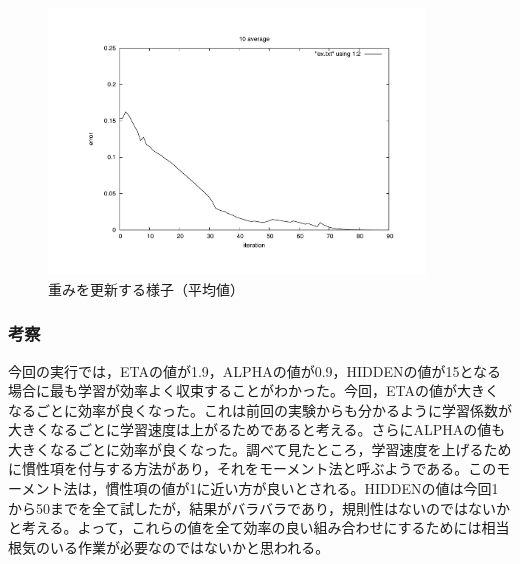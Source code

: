 \begin{figure}[h]
 \begin{center}
  \includegraphics[width=10.0cm,angle=-90]{figs/ave1.pdf}
  \caption{重みを更新する様子（平均値）}
  \label{fig:level2}
 \end{center}
\end{figure}


\subsubsection{考察}
今回の実行では，ETAの値が1.9，ALPHAの値が0.9，HIDDENの値が15となる場合に最も学習が効率よく収束することがわかった。今回，ETAの値が大きくなるごとに効率が良くなった。これは前回の実験からも分かるように学習係数が大きくなるごとに学習速度は上がるためであると考える。さらにALPHAの値も大きくなるごとに効率が良くなった。調べて見たところ，学習速度を上げるために慣性項を付与する方法があり，それをモーメント法と呼ぶようである。このモーメント法は，慣性項の値が1に近い方が良いとされる。HIDDENの値は今回1から50までを全て試したが，結果がバラバラであり，規則性はないのではないかと考える。よって，これらの値を全て効率の良い組み合わせにするためには相当根気のいる作業が必要なのではないかと思われる。

